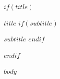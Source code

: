 \documentclass[11pt,a4paper]{article}
\begin{document}
$if(title)$
\begin{center}
{\sffamily\bfseries\Large $title$}
$if(subtitle)$

{\small\color{MutedText}$subtitle$}
$endif$
\end{center}
\vspace{2mm}
$endif$

$body$
\end{document}
